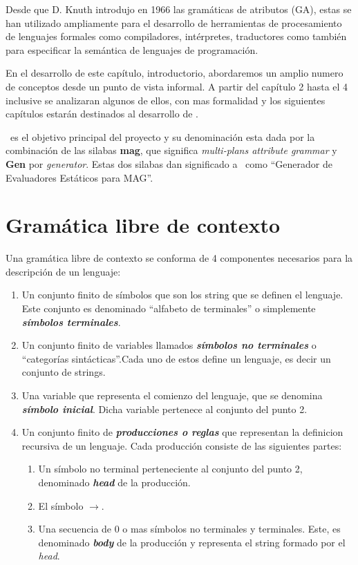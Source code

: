 Desde que D. Knuth introdujo en 1966 las gramáticas de atributos (GA), estas se han utilizado ampliamente para el desarrollo de herramientas de procesamiento de lenguajes formales como compiladores, intérpretes, traductores como también para especificar la semántica de lenguajes de programación.

En el desarrollo de este capítulo, introductorio, abordaremos un amplio numero de conceptos desde un punto de vista informal. A partir del capítulo 2 hasta el 4 inclusive se analizaran algunos de ellos, con mas formalidad y los siguientes capítulos estarán destinados al desarrollo de \maggen. 

\maggen\ es el objetivo principal del proyecto y su denominación esta dada por la combinación de las silabas \textbf{mag}, que significa \textit{multi-plans attribute grammar} y \textbf{Gen} por \textit{generator}. Estas dos silabas dan significado a \maggen\ como ``Generador de Evaluadores Estáticos para MAG''.

\section{Gramática libre de contexto}

Una gramática libre de contexto se conforma de 4 componentes necesarios para la descripción de un lenguaje:
\begin{enumerate}
\item Un conjunto finito de símbolos que son los string que se definen el lenguaje. Este conjunto es denominado ``alfabeto de terminales'' o simplemente \textit{\textbf{símbolos terminales}}.

\item Un conjunto finito de variables llamados \textit{\textbf{símbolos no terminales}} o ``categorías sintácticas''.Cada uno de estos define un lenguaje, es decir un conjunto de strings.

\item Una variable que representa el comienzo del lenguaje, que se denomina \textit{\textbf{símbolo inicial}}. Dicha variable pertenece al conjunto del punto 2.

\item Un conjunto finito de \textit{\textbf{producciones o reglas}} que representan la definicion recursiva de un lenguaje. Cada producción consiste de las siguientes partes:

\begin{enumerate}
\item Un símbolo no terminal perteneciente al conjunto del punto 2, denominado \textit{\textbf{head}} de la producción.

\item El símbolo \textbf{$\rightarrow$}.

\item Una secuencia de 0 o mas símbolos no terminales y terminales. Este, es denominado \textit{\textbf{body}} de la producción y representa el string formado por el \textit{head}.
\end{enumerate}

\end{enumerate}

